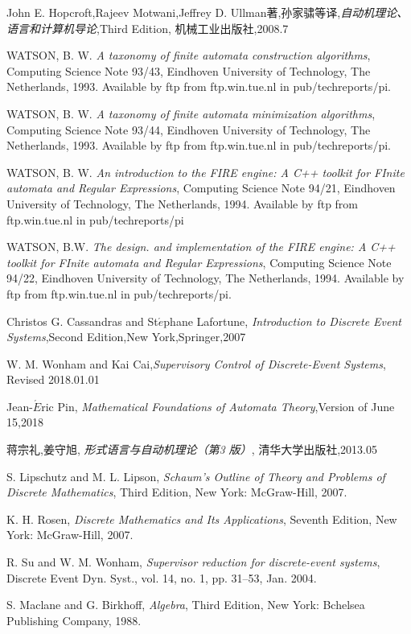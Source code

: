 %

\begin{thebibliography}{99}
	John E. Hopcroft,Rajeev Motwani,Jeffrey D. Ullman著,孙家骕等译,\textit{自动机理论、语言和计算机导论},Third Edition, 机械工业出版社,2008.7
	
	WATSON, B. W. \textit{A taxonomy of finite automata construction algorithms}, Computing Science Note 93/43, Eindhoven University of Technology, The Netherlands, 1993. Available by ftp from ftp.win.tue.nl in pub/techreports/pi.
	
	WATSON, B. W. \textit{A taxonomy of finite automata minimization algorithms}, Computing Science Note 93/44, Eindhoven University of Technology, The Netherlands, 1993. Available by ftp from ftp.win.tue.nl in pub/techreports/pi.
	
	WATSON, B. W. \textit{An introduction to the FIRE engine: A C++ toolkit for FInite automata and Regular Expressions}, Computing Science Note 94/21, Eindhoven University of Technology, The Netherlands, 1994. Available by ftp from ftp.win.tue.nl in pub/techreports/pi
	
	WATSON, B.W. \textit{The design. and implementation of the FIRE engine:	A C++ toolkit for FInite automata and Regular Expressions}, Computing Science Note 94/22, Eindhoven University of Technology, The Netherlands, 1994. Available by ftp from ftp.win.tue.nl in pub/techreports/pi.
	
	Christos G. Cassandras and St$\acute{e}$phane Lafortune, \textit{Introduction to Discrete Event Systems},Second Edition,New York,Springer,2007
	
	W. M. Wonham and Kai Cai,\textit{Supervisory Control of Discrete-Event Systems}, Revised 2018.01.01
	
	Jean-$\acute{E}$ric Pin, \textit{Mathematical Foundations of Automata Theory},Version of June 15,2018
	
	蒋宗礼,姜守旭, \textit{形式语言与自动机理论（第3 版）}, 清华大学出版社,2013.05
	
	
	S. Lipschutz and M. L. Lipson, \textit{Schaum's Outline of Theory and Problems of Discrete Mathematics}, Third Edition, New York: McGraw-Hill, 2007.
	
	K. H. Rosen, \textit{Discrete Mathematics and Its Applications}, Seventh Edition, New York: McGraw-Hill, 2007.
	
	R. Su and W. M. Wonham, \textit{Supervisor reduction for discrete-event systems}, Discrete Event Dyn. Syst., vol. 14, no. 1, pp. 31–53, Jan. 2004.
	
	S. Maclane and G. Birkhoff, \textit{Algebra}, Third Edition, New York: Bchelsea Publishing Company, 1988.
\end{thebibliography}

